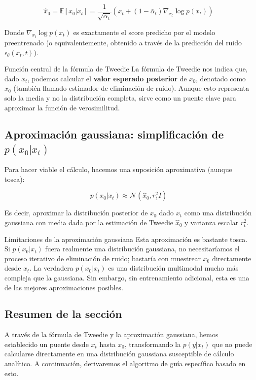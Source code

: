 \documentclass[a4paper]{article}
\begin{document}
$$
\hat{x}_0 = \mathbb{E}[x_0 | x_t] = \frac{1}{\sqrt{\bar{\alpha}_t}} \left( x_t + (1 - \bar{\alpha}_t) \nabla_{x_t} \log p(x_t) \right)
$$

Donde $\nabla_{x_t} \log p(x_t)$ es exactamente el score predicho por el modelo preentrenado (o equivalentemente, obtenido a través de la predicción del ruido $\epsilon_\theta(x_t, t)$).

\begin{importantbox}{Función central de la fórmula de Tweedie}
La fórmula de Tweedie nos indica que, dado $x_t$, podemos calcular el \textbf{valor esperado posterior} de $x_0$, denotado como $\hat{x}_0$ (también llamado estimador de eliminación de ruido). Aunque esto representa solo la media y no la distribución completa, sirve como un puente clave para aproximar la función de verosimilitud.
\end{importantbox}

\subsection{Aproximación gaussiana: simplificación de $p(x_0 | x_t)$}

Para hacer viable el cálculo, hacemos una suposición aproximativa (aunque tosca):

$$
p(x_0 | x_t) \approx \mathcal{N}(\hat{x}_0, r_t^2 I)
$$

Es decir, aproximar la distribución posterior de $x_0$ dado $x_t$ como una distribución gaussiana con media dada por la estimación de Tweedie $\hat{x}_0$ y varianza escalar $r_t^2$.

\begin{warningbox}{Limitaciones de la aproximación gaussiana}
Esta aproximación es bastante tosca. Si $p(x_0|x_t)$ fuera realmente una distribución gaussiana, no necesitaríamos el proceso iterativo de eliminación de ruido; bastaría con muestrear $x_0$ directamente desde $x_t$. La verdadera $p(x_0|x_t)$ es una distribución multimodal mucho más compleja que la gaussiana. Sin embargo, sin entrenamiento adicional, esta es una de las mejores aproximaciones posibles.
\end{warningbox}

\subsection{Resumen de la sección}

A través de la fórmula de Tweedie y la aproximación gaussiana, hemos establecido un puente desde $x_t$ hasta $x_0$, transformando la $p(y|x_t)$ que no puede calcularse directamente en una distribución gaussiana susceptible de cálculo analítico. A continuación, derivaremos el algoritmo de guía específico basado en esto.
\end{document}
